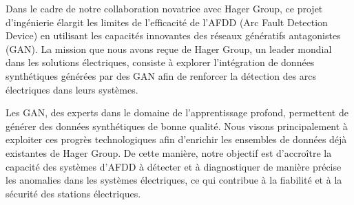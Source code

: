 Dans le cadre de notre collaboration novatrice avec Hager Group, ce projet d'ingénierie élargit les limites de l'efficacité de l'AFDD (Arc Fault Detection Device) en utilisant les capacités innovantes des réseaux génératifs antagonistes (GAN). La mission que nous avons reçue de Hager Group, un leader mondial dans les solutions électriques, consiste à explorer l'intégration de données synthétiques générées par des GAN afin de renforcer la détection des arcs électriques dans leurs systèmes.

Les GAN, des experts dans le domaine de l'apprentissage profond, permettent de générer des données synthétiques de bonne qualité. Nous visons principalement à exploiter ces progrès technologiques afin d'enrichir les ensembles de données déjà existantes de Hager Group. De cette manière, notre objectif est d'accroître la capacité des systèmes d'AFDD à détecter et à diagnostiquer de manière précise les anomalies dans les systèmes électriques, ce qui contribue à la fiabilité et à la sécurité des stations électriques.